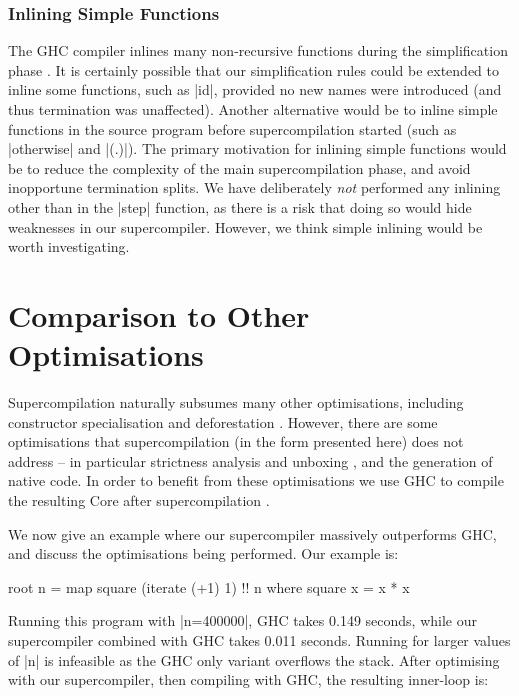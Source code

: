 \documentclass[draft]{sigplanconf}
\begin{document}
\subsubsection{Inlining Simple Functions}

The GHC compiler inlines many non-recursive functions during the simplification phase \cite{spj:inlining}. It is certainly possible that our simplification rules could be extended to inline some functions, such as |id|, provided no new names were introduced (and thus termination was unaffected). Another alternative would be to inline simple functions in the source program before supercompilation started (such as |otherwise| and |(.)|). The primary motivation for inlining simple functions would be to reduce the complexity of the main supercompilation phase, and avoid inopportune termination splits. We have deliberately \textit{not} performed any inlining other than in the |step| function, as there is a risk that doing so would hide weaknesses in our supercompiler. However, we think simple inlining would be worth investigating.

\section{Comparison to Other Optimisations}
\label{sec:examples}

Supercompilation naturally subsumes many other optimisations, including constructor specialisation \cite{spj:specconstr} and deforestation \cite{gill:shortcut_deforestation,wadler:deforestation}. However, there are some optimisations that supercompilation (in the form presented here) does not address -- in particular strictness analysis and unboxing \cite{spj:unboxing}, and the generation of native code. In order to benefit from these optimisations we use GHC to compile the resulting Core after supercompilation \cite{ghc6_12}.

We now give an example where our supercompiler massively outperforms GHC, and discuss the optimisations being performed. Our example is:

\begin{code}
root n = map square (iterate (+1) 1) !! n
    where square x = x * x
\end{code}

Running this program with |n=400000|, GHC takes 0.149 seconds, while our supercompiler combined with GHC takes 0.011 seconds. Running for larger values of |n| is infeasible as the GHC only variant overflows the stack. After optimising with our supercompiler, then compiling with GHC, the resulting inner-loop is:
\end{document}
